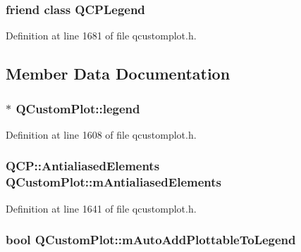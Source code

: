 \hypertarget{class_q_custom_plot_a8429035e7adfbd7f05805a6530ad5e3b}{
\subsubsection[{Q\-C\-P\-Legend}]{\setlength{\rightskip}{0pt plus 5cm}friend class {\bf Q\-C\-P\-Legend}\hspace{0.3cm}{\ttfamily [friend]}}}\label{class_q_custom_plot_a8429035e7adfbd7f05805a6530ad5e3b}


Definition at line 1681 of file qcustomplot.\-h.



\subsection{Member Data Documentation}
\hypertarget{class_q_custom_plot_a73da53368aa4c2db3d874cf0db50d140}{
\subsubsection[{legend}]{$\ast$ Q\-Custom\-Plot\-::legend}}\label{class_q_custom_plot_a73da53368aa4c2db3d874cf0db50d140}


Definition at line 1608 of file qcustomplot.\-h.

\hypertarget{class_q_custom_plot_aa333200629256830e273873b582a5524}{
\subsubsection[{m\-Antialiased\-Elements}]{\setlength{\rightskip}{0pt plus 5cm}Q\-C\-P\-::\-Antialiased\-Elements Q\-Custom\-Plot\-::m\-Antialiased\-Elements\hspace{0.3cm}{\ttfamily [protected]}}}\label{class_q_custom_plot_aa333200629256830e273873b582a5524}


Definition at line 1641 of file qcustomplot.\-h.

\hypertarget{class_q_custom_plot_aaf3ea6a4cb04d35a149cc9a0cdac3394}{
\subsubsection[{m\-Auto\-Add\-Plottable\-To\-Legend}]{\setlength{\rightskip}{0pt plus 5cm}bool Q\-Custom\-Plot\-::m\-Auto\-Add\-Plottable\-To\-Legend\hspace{0.3cm}{\ttfamily [protected]}}}\label{class_q_custom_plot_aaf3ea6a4cb04d35a149cc9a0cdac3394}


